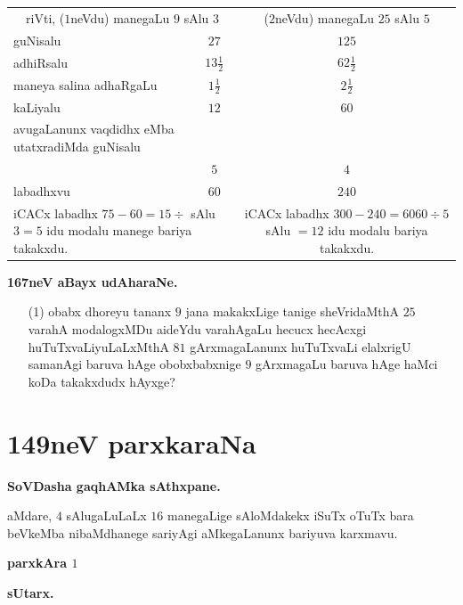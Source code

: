 \begin{tabular}{lc@{\qquad}c}
\multicolumn{2}{c}{riVti, ($1$neVdu) manegaLu $9$ sAlu $3$} &
($2$neVdu) manegaLu $25$ sAlu $5$\\[4pt]
\qquad guNisalu & $27$ & $125$\\[2pt]
\qquad adhiRsalu & $13\frac{1}{2}$ & $62\frac{1}{2}$\\[2pt]
\qquad maneya salina adhaRgaLu & $1\frac{1}{2}$ & $2\frac{1}{2}$\\[2pt]
\qquad kaLiyalu & $12$ & $60$\\[2pt]
\multicolumn{2}{l}{\qquad avugaLanunx vaqdidhx eMba utatxradiMda guNisalu}\\[2pt]
 & $5$ & $4$\\[2pt]
\qquad labadhxvu & $60$ & $240$\\[3pt]
\multicolumn{2}{p{5.5cm}}{iCACx labadhx $75-60=15\div$ sAlu $3=5$ idu
modalu manege bariya takakxdu.} &
\multicolumn{1}{p{6cm}}{iCACx labadhx $300-240=60$\quad $60\div 5$
sAlu $=12$ idu modalu bariya takakxdu.}
\end{tabular}

\medskip
\begin{center}
{\large\bf 167neV aBayx udAharaNe.}
\end{center}

\begin{itemize}
\item[\rm(1)] obabx dhoreyu tananx $9$ jana makakxLige tanige
sheVridaMthA $25$ varahA modalogxMDu aideYdu varahAgaLu hecucx
hecAcxgi huTuTxvaLiyuLaLxMthA $81$ gArxmagaLanunx huTuTxvaLi elalxrigU
samanAgi baruva hAge obobxbabxnige $9$ gArxmagaLu baruva hAge haMci
koDa takakxdudx hAyxge?
\end{itemize}


\chapter{149neV parxkaraNa}

\begin{center}
{\large\bf SoVDasha gaqhAMka sAthxpane.}
\end{center}

aMdare, $4$ sAlugaLuLaLx $16$ manegaLige sAloMdakekx iSuTx oTuTx bara
beVkeMba nibaMdhanege sariyAgi aMkegaLanunx bariyuva karxmavu.

\medskip
\begin{center}
{\large\bf parxkAra $1$}

\bigskip

{\large\bf sUtarx.}
\end{center}

